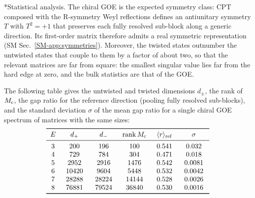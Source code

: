 \documentclass[aps,twocolumn,preprintnumbers,groupedaddress,nofootinbib,prl]{revtex4-2}
\makeatletter
\renewcommand\paragraph{\@startsection{paragraph}{4}{\parindent}{\z@}{-1em}{\normalfont\normalsize\bfseries}}
\newcommand{\cMat}{{\rm c}}
\newcommand{\rmean}{\langle r\rangle}
\newcommand{\Mc}{M_{\cMat}}
\DeclareMathOperator{\rank}{rank}
\makeatother
\begin{document}
\paragraph*{Statistical analysis.}
The chiral GOE is the expected symmetry class: CPT composed with the R-symmetry Weyl reflections defines an antiunitary symmetry $T$ with $T^2=+1$ that preserves each fully resolved sub-block along a generic direction. Its first-order matrix therefore admits a real symmetric representation (SM Sec.~\ref{SM-app:symmetries}). Moreover, the twisted states outnumber the untwisted states that couple to them by a factor of about two, so that the relevant matrices are far from square: the smallest singular value lies far from the hard edge at zero, and the bulk statistics are that of the GOE.

The following table gives the untwisted and twisted dimensions $d_\pm$, the rank of $\Mc$, the gap ratio for the reference direction (pooling fully resolved sub-blocks), and the standard deviation $\sigma$ of the mean gap ratio for a single chiral GOE spectrum of matrices with the same sizes:
\begin{equation*}
\begin{tabular}{cccccc}
\toprule
$E$ & $d_+$ & $d_-$ & $\rank \Mc$ & $\rmean_{\rm ref}$ & $\sigma$ \\
\midrule
3 & 200    & 196   & 100    & $0.541$ & $0.032$ \\
4 & 729    & 784   & 304   & $0.471$ & $0.018$ \\
5 & 2952   & 2916  & 1476  & $0.542$ & $0.0081$ \\
6 & 10420  & 9604  & 5448  & $0.532$ & $0.0042$ \\
7 & 28288  & 28224 & 14144 & $0.528$ & $0.0026$ \\
8 & \;76881\; & \;79524\; & \;36840\; & $ \;0.530\; $ & $\;0.0016\;$ \\
\bottomrule
\end{tabular}
\end{equation*}
\end{document}
